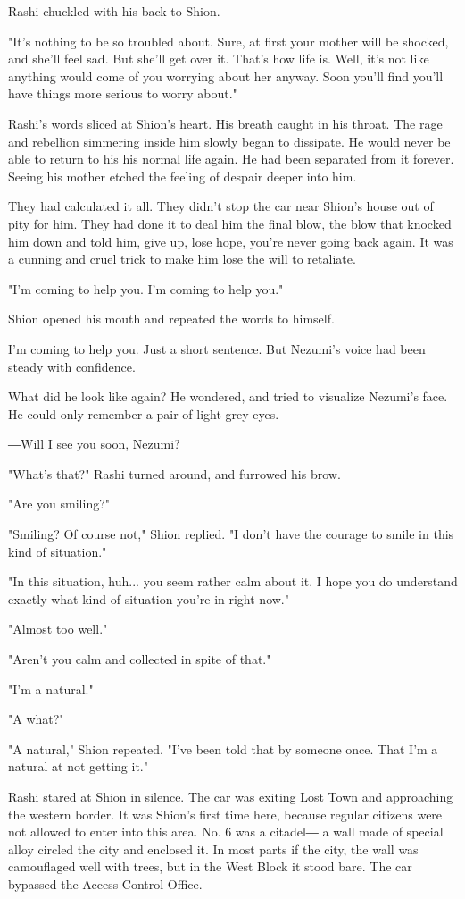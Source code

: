 Rashi chuckled with his back to Shion.

"It's nothing to be so troubled about. Sure, at first your mother will
be shocked, and she'll feel sad. But she'll get over it. That's how life
is. Well, it's not like anything would come of you worrying about her
anyway. Soon you'll find you'll have things more serious to worry
about."

Rashi's words sliced at Shion's heart. His breath caught in his throat.
The rage and rebellion simmering inside him slowly began to dissipate.
He would never be able to return to his his normal life again. He had
been separated from it forever. Seeing his mother etched the feeling of
despair deeper into him.

They had calculated it all. They didn't stop the car near Shion's house
out of pity for him. They had done it to deal him the final blow, the
blow that knocked him down and told him, give up, lose hope, you're
never going back again. It was a cunning and cruel trick to make him
lose the will to retaliate.

"I'm coming to help you. I'm coming to help you."

Shion opened his mouth and repeated the words to himself.

I'm coming to help you. Just a short sentence. But Nezumi's voice had
been steady with confidence.

What did he look like again? He wondered, and tried to visualize
Nezumi's face. He could only remember a pair of light grey eyes.

―Will I see you soon, Nezumi?

"What's that?" Rashi turned around, and furrowed his brow.

"Are you smiling?"

"Smiling? Of course not," Shion replied. "I don't have the courage to
smile in this kind of situation."

"In this situation, huh... you seem rather calm about it. I hope you do
understand exactly what kind of situation you're in right now."

"Almost too well."

"Aren't you calm and collected in spite of that."

"I'm a natural."

"A what?"

"A natural," Shion repeated. "I've been told that by someone once. That
I'm a natural at not getting it."

Rashi stared at Shion in silence. The car was exiting Lost Town and
approaching the western border. It was Shion's first time here, because
regular citizens were not allowed to enter into this area. No. 6 was a
citadel― a wall made of special alloy circled the city and enclosed it.
In most parts if the city, the wall was camouflaged well with trees, but
in the West Block it stood bare. The car bypassed the Access Control
Office.


